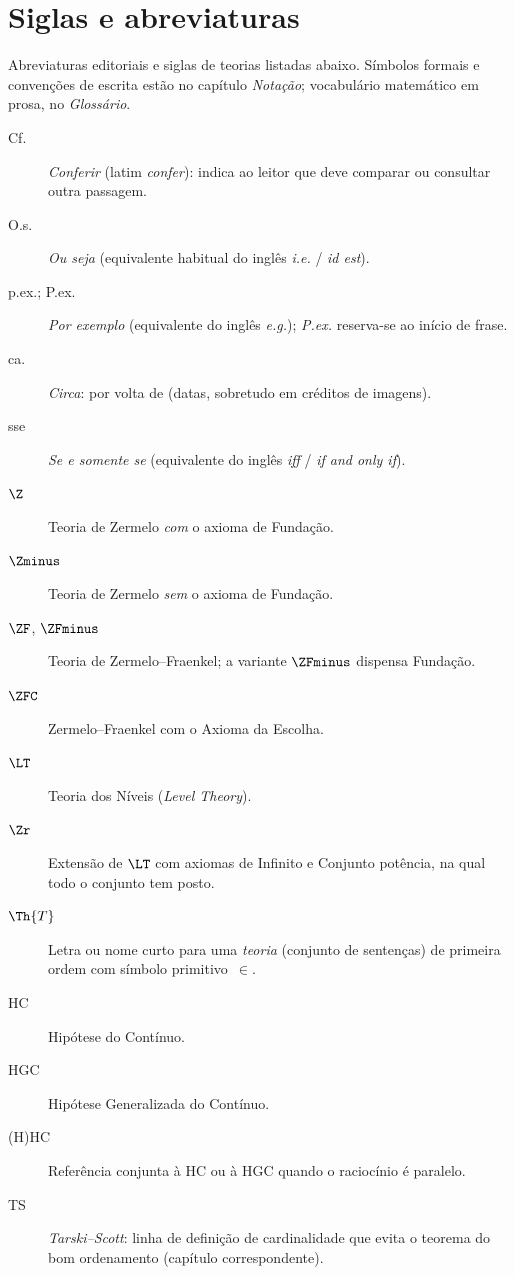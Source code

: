 
\clearpage
{}
\chapter*{Siglas e abreviaturas}

\noindent
Abreviaturas editoriais e siglas de teorias listadas abaixo. Símbolos formais e convenções de escrita estão no capítulo \emph{Notação}; vocabulário matemático em prosa, no \emph{Glossário}.

\begin{description}
\item[Cf.] \emph{Conferir} (latim \textit{confer}): indica ao leitor que deve comparar ou consultar outra passagem.
\item[O.s.] \emph{Ou seja} (equivalente habitual do inglês \textit{i.e.} / \textit{id est}).
\item[p.ex.; P.ex.] \emph{Por exemplo} (equivalente do inglês \textit{e.g.}); \emph{P.ex.} reserva-se ao início de frase.
\item[ca.] \textit{Circa}: por volta de (datas, sobretudo em créditos de imagens).
\item[sse] \emph{Se e somente se} (equivalente do inglês \textit{iff} / \textit{if and only if}).
\item[$\Z$] Teoria de Zermelo \emph{com} o axioma de Fundação.
\item[$\Zminus$] Teoria de Zermelo \emph{sem} o axioma de Fundação.
\item[$\ZF$, $\ZFminus$] Teoria de Zermelo--Fraenkel; a variante $\ZFminus$ dispensa Fundação.
\item[$\ZFC$] Zermelo--Fraenkel com o Axioma da Escolha.
\item[$\LT$] Teoria dos Níveis (\textit{Level Theory}).
\item[$\Zr$] Extensão de $\LT$ com axiomas de Infinito e Conjunto potência, na qual todo o conjunto tem posto.
\item[$\Th{T}$] Letra ou nome curto para uma \emph{teoria} (conjunto de sentenças) de primeira ordem com símbolo primitivo~$\in$.
\item[HC] Hipótese do Contínuo.
\item[HGC] Hipótese Generalizada do Contínuo.
\item[(H)HC] Referência conjunta à HC ou à HGC quando o raciocínio é paralelo.
\item[TS] \emph{Tarski--Scott}: linha de definição de cardinalidade que evita o teorema do bom ordenamento (capítulo correspondente).
\end{description}
